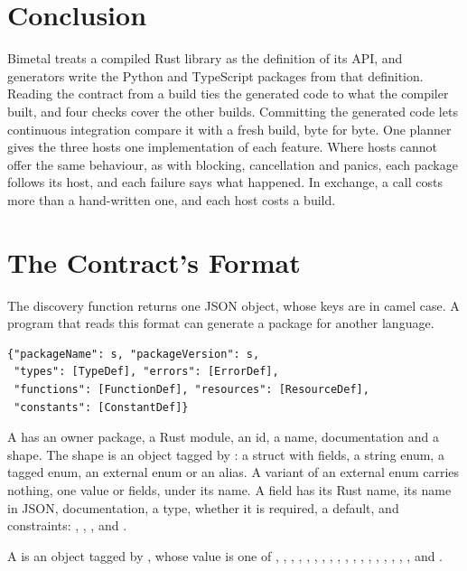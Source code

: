 \documentclass[sigconf,nonacm]{acmart}
\begin{document}
\section{Conclusion}

Bimetal treats a compiled Rust library as the definition of its API, and generators write the Python and TypeScript packages from that definition. Reading the contract from a build ties the generated code to what the compiler built, and four checks cover the other builds. Committing the generated code lets continuous integration compare it with a fresh build, byte for byte. One planner gives the three hosts one implementation of each feature. Where hosts cannot offer the same behaviour, as with blocking, cancellation and panics, each package follows its host, and each failure says what happened. In exchange, a call costs more than a hand-written one, and each host costs a build.

\appendix

\section{The Contract's Format}
\label{app:contract}

The discovery function returns one JSON object, whose keys are in camel case. A program that reads this format can generate a package for another language.

\begin{footnotesize}
\begin{verbatim}
{"packageName": s, "packageVersion": s,
 "types": [TypeDef], "errors": [ErrorDef],
 "functions": [FunctionDef], "resources": [ResourceDef],
 "constants": [ConstantDef]}
\end{verbatim}
\end{footnotesize}

A  has an owner package, a Rust module, an id, a name, documentation and a shape. The shape is an object tagged by : a struct with fields, a string enum, a tagged enum, an external enum or an alias. A variant of an external enum carries nothing, one value or fields, under its name. A field has its Rust name, its name in JSON, documentation, a type, whether it is required, a default, and constraints: , , ,  and .

A  is an object tagged by , whose value is one of , , , , , , , , , , , , , , , , , ,  and .
\end{document}
